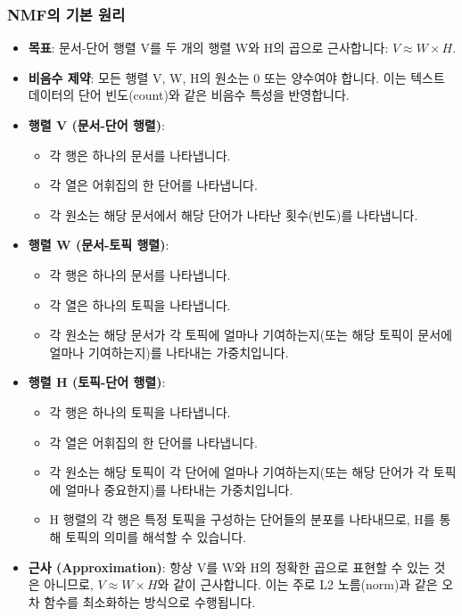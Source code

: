 \documentclass[11pt,a4paper]{article}
\theoremstyle{definition}
\begin{document}
\subsubsection*{NMF의 기본 원리}
\begin{itemize}
    \item \textbf{목표}: 문서-단어 행렬 V를 두 개의 행렬 W와 H의 곱으로 근사합니다: $V \approx W \times H$.
    \item \textbf{비음수 제약}: 모든 행렬 V, W, H의 원소는 0 또는 양수여야 합니다. 이는 텍스트 데이터의 단어 빈도(count)와 같은 비음수 특성을 반영합니다.
    \item \textbf{행렬 V (문서-단어 행렬)}:
    \begin{itemize}
        \item 각 행은 하나의 문서를 나타냅니다.
        \item 각 열은 어휘집의 한 단어를 나타냅니다.
        \item 각 원소는 해당 문서에서 해당 단어가 나타난 횟수(빈도)를 나타냅니다.
    \end{itemize}
    \item \textbf{행렬 W (문서-토픽 행렬)}:
    \begin{itemize}
        \item 각 행은 하나의 문서를 나타냅니다.
        \item 각 열은 하나의 토픽을 나타냅니다.
        \item 각 원소는 해당 문서가 각 토픽에 얼마나 기여하는지(또는 해당 토픽이 문서에 얼마나 기여하는지)를 나타내는 가중치입니다.
    \end{itemize}
    \item \textbf{행렬 H (토픽-단어 행렬)}:
    \begin{itemize}
        \item 각 행은 하나의 토픽을 나타냅니다.
        \item 각 열은 어휘집의 한 단어를 나타냅니다.
        \item 각 원소는 해당 토픽이 각 단어에 얼마나 기여하는지(또는 해당 단어가 각 토픽에 얼마나 중요한지)를 나타내는 가중치입니다.
    \item H 행렬의 각 행은 특정 토픽을 구성하는 단어들의 분포를 나타내므로, H를 통해 토픽의 의미를 해석할 수 있습니다.
    \end{itemize}
    \item \textbf{근사 (Approximation)}: 항상 V를 W와 H의 정확한 곱으로 표현할 수 있는 것은 아니므로, $V \approx W \times H$와 같이 근사합니다. 이는 주로 L2 노름(norm)과 같은 오차 함수를 최소화하는 방식으로 수행됩니다.
\end{itemize}
\end{document}
